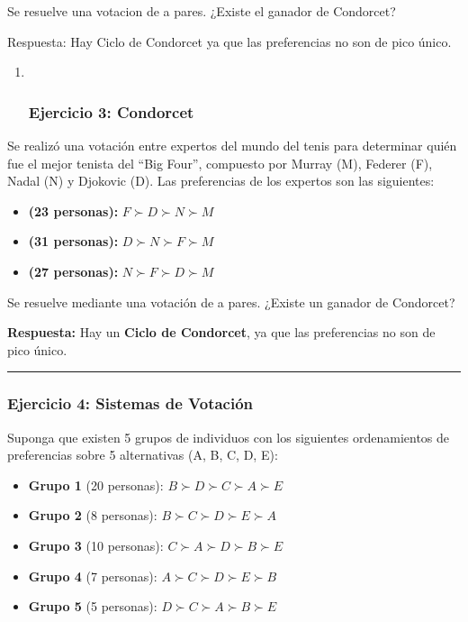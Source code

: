 \documentclass[
  letterpaper,
  DIV=11,
  numbers=noendperiod]{scrartcl}
\providecommand{\tightlist}{%
  \setlength{\itemsep}{0pt}\setlength{\parskip}{0pt}}
\begin{document}
Se resuelve una votacion de a pares. ¿Existe el ganador de Condorcet?

Respuesta: Hay Ciclo de Condorcet ya que las preferencias no son de pico
único.

\hfill\break

\begin{enumerate}
\def\labelenumi{\arabic{enumi})}
\setcounter{enumi}{3}
\item ~
  \subsubsection{Ejercicio 3: Condorcet}\label{ejercicio-3-condorcet}
\end{enumerate}

Se realizó una votación entre expertos del mundo del tenis para
determinar quién fue el mejor tenista del ``Big Four'', compuesto por
Murray (M), Federer (F), Nadal (N) y Djokovic (D). Las preferencias de
los expertos son las siguientes:

\begin{itemize}
\tightlist
\item
  \textbf{(23 personas):} \(F \succ D \succ N \succ M\)
\item
  \textbf{(31 personas):} \(D \succ N \succ F \succ M\)
\item
  \textbf{(27 personas):} \(N \succ F \succ D \succ M\)
\end{itemize}

Se resuelve mediante una votación de a pares. ¿Existe un ganador de
Condorcet?

\textbf{Respuesta:} Hay un \textbf{Ciclo de Condorcet}, ya que las
preferencias no son de pico único.

\begin{center}\rule{0.5\linewidth}{0.5pt}\end{center}

\subsubsection{Ejercicio 4: Sistemas de
Votación}\label{ejercicio-4-sistemas-de-votaciuxf3n}

Suponga que existen 5 grupos de individuos con los siguientes
ordenamientos de preferencias sobre 5 alternativas (A, B, C, D, E):

\begin{itemize}
\tightlist
\item
  \textbf{Grupo 1} (20 personas): \(B \succ D \succ C \succ A \succ E\)
\item
  \textbf{Grupo 2} (8 personas): \(B \succ C \succ D \succ E \succ A\)
\item
  \textbf{Grupo 3} (10 personas): \(C \succ A \succ D \succ B \succ E\)
\item
  \textbf{Grupo 4} (7 personas): \(A \succ C \succ D \succ E \succ B\)
\item
  \textbf{Grupo 5} (5 personas): \(D \succ C \succ A \succ B \succ E\)
\end{itemize}
\end{document}
